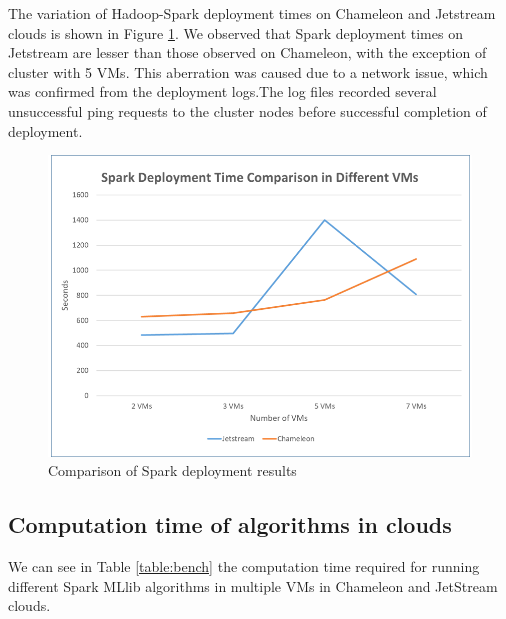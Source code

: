 \documentclass[9pt,twocolumn,twoside]{styles/osajnl}
\begin{document}
The variation of Hadoop-Spark deployment times on Chameleon and Jetstream clouds is shown in Figure \ref{fig:spd}. We observed that Spark deployment times on Jetstream are lesser than those observed on Chameleon, with the exception of cluster with 5 VMs.
This aberration was caused due to a network issue, which was confirmed from the deployment logs.The log files recorded several unsuccessful ping requests to the cluster nodes before successful completion of deployment.

\begin{figure}[h!]
	\centering
	\includegraphics[width=\linewidth,scale=1]{images/finalspdeployment.png}
	\caption{Comparison of Spark deployment results}
	\label{fig:spd}
\end{figure}

\subsection{Computation time of algorithms in clouds}

We can see in Table \ref{table:bench} the computation time required for running different Spark MLlib algorithms in multiple VMs in Chameleon and JetStream clouds.
\end{document}

